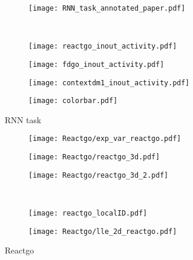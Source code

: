\documentclass[11pt,a4paper]{article}
\begin{document}
\begin{figure}
 \centering
 \begin{subfigure}[b]{0.80\textwidth}
   \centering
   \texttt{[image: RNN\_task\_annotated\_paper.pdf]}
 \end{subfigure}\\
 \begin{subfigure}[b]{0.29\textwidth}
   \centering
   \texttt{[image: reactgo\_inout\_activity.pdf]}
 \end{subfigure}\label{fig:RNN_task:reactgo}
 \begin{subfigure}[b]{0.29\textwidth}
   \centering
   \texttt{[image: fdgo\_inout\_activity.pdf]}
 \end{subfigure}\label{fig:RNN_task:fdgo}
\begin{subfigure}[b]{0.29\textwidth}
   \centering
   \texttt{[image: contextdm1\_inout\_activity.pdf]}
\end{subfigure}\label{fig:RNN_task:contextdm1}
\begin{subfigure}[b]{0.10\textwidth}
   \centering
   \texttt{[image: colorbar.pdf]}
\end{subfigure}\label{fig:RNN_task:colorbar}
\caption{RNN task}\label{fig:RNN_task}
\end{figure}


\begin{figure}
 \centering
 \begin{subfigure}[b]{0.25\textwidth}
   \centering
   \texttt{[image: Reactgo/exp\_var\_reactgo.pdf]}
 \end{subfigure}\label{fig:Reactgo:exp_var_reactgo}
 \begin{subfigure}[b]{0.30\textwidth}
   \centering
   \texttt{[image: Reactgo/reactgo\_3d.pdf]}
 \end{subfigure}\label{fig:Reactgo:reactgo_3d}
 \begin{subfigure}[b]{0.40\textwidth}
   \centering
   \texttt{[image: Reactgo/reactgo\_3d\_2.pdf]}
 \end{subfigure}\label{fig:Reactgo:reactgo_3d_2}\\
  \begin{subfigure}[b]{0.45\textwidth}
    \centering
    \texttt{[image: reactgo\_localID.pdf]}
  \end{subfigure}\label{fig:Reactgo:hist2D_reactgo_localFCI}
 \begin{subfigure}[b]{0.45\textwidth}
    \centering
    \texttt{[image: Reactgo/lle\_2d\_reactgo.pdf]}
  \end{subfigure}\label{fig:Reactgo:lle_2d_reactgo}
 \caption{Reactgo}\label{fig:Reactgo}
\end{figure}
\end{document}
